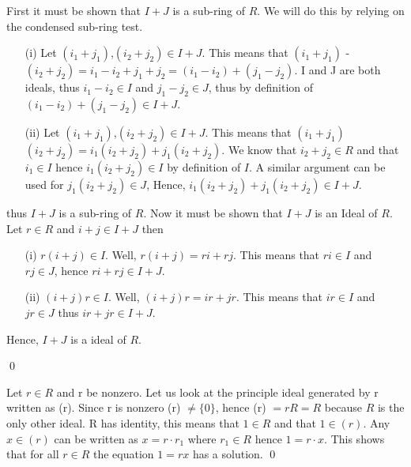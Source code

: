 \documentclass[11pt]{article}
\begin{document}

\affirmation


\proof 
{
  First it must be shown that \(I+J\) is a sub-ring of \(R\). We will do this by relying on the condensed sub-ring test. 
  \begin{itemize}
      \item[(i)] Let \((i_1 +j_1)\),\((i_2+j_2) \in I+J\). This means that \((i_1 +j_1)\) - \((i_2+j_2) = i_1 - i_2 + j_1 + j_2 = (i_1 - i_2) + (j_1 - j_2)\).
      I and J are both ideals, thus \(i_1 - i_2 \in I\) and \(j_1 - j_2 \in J\), thus by definition of \((i_1 - i_2) + (j_1 - j_2) \in I+J\).
      \item[(ii)] Let \((i_1 +j_1)\),\((i_2+j_2) \in I+J\). This means that \((i_1 +j_1)\)\((i_2+j_2) = i_1(i_2+j_2)+ j_1(i_2+j_2)\). We know that \(i_2+j_2 \in R\)  and that \(i_1 \in I\) hence \(i_1(i_2+j_2) \in I\) by definition of \(I\). A similar argument can be used for \(j_1(i_2+j_2) \in J\), Hence, \(i_1(i_2+j_2)+ j_1(i_2+j_2) \in I+J\). 
  \end{itemize}
  thus \(I+J\) is a sub-ring of \(R.\) Now it must be shown that \(I + J\) is an Ideal of \(R\). Let \(r\in R\) and \(i+j \in I+J\) then
  \begin{itemize}
      \item[(i)]\(r(i+j) \in I\). Well, \(r(i+j) = ri + rj\). This means that \(ri \in I\) and \(rj \in J\), hence \(ri + rj \in I+J\).    
      \item[(ii)]\((i+j)r \in I\). Well, \((i+j)r = ir + jr\). This means that \(ir \in I\) and \(jr \in J\) thus \(ir + jr \in I+J\).
  \end{itemize}
  Hence, \(I +J\) is a ideal of \(R\).
}

\qed


\proof
{
Let \(r \in R\) and r be nonzero. Let us look at the principle ideal generated by r written as (r). Since r is nonzero (r) \(\neq  \{0\}\), hence (r) \(= rR = R\) because \(R\) is the only other ideal. R has identity, this means that \(1 \in R\) and that \(1 \in (r)\). Any \(x \in (r)\) can be written as \(x= r \cdot r_1\) where \(r_1 \in R\) hence \(1= r\cdot x\). This shows that for all \(r\in R\) the equation \(1= rx\) has a solution. 
}
\qed
\end{document}
